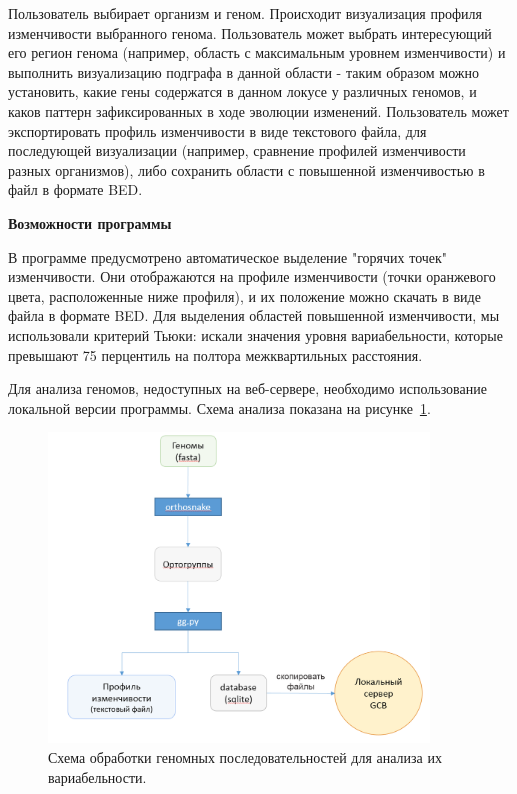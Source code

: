 Пользователь выбирает организм и геном. Происходит визуализация профиля изменчивости выбранного генома. Пользователь может выбрать интересующий его регион генома (например, область с максимальным уровнем изменчивости) и выполнить визуализацию подграфа в данной области - таким образом можно установить, какие гены содержатся в данном локусе у различных геномов, и каков паттерн зафиксированных в ходе эволюции изменений. Пользователь может экспортировать профиль изменчивости в виде текстового файла, для последующей визуализации (например, сравнение профилей изменчивости разных организмов), либо сохранить области с повышенной изменчивостью в файл в формате BED. 

\textbf{Возможности программы}

В программе предусмотрено автоматическое выделение "горячих точек" изменчивости. Они отображаются на профиле изменчивости (точки оранжевого цвета, расположенные ниже профиля), и их положение можно скачать в виде файла в формате BED. Для выделения областей повышенной изменчивости, мы использовали критерий Тьюки: искали значения уровня вариабельности, которые превышают 75 перцентиль на полтора межквартильных расстояния. 

Для анализа геномов, недоступных на веб-сервере, необходимо использование локальной версии программы. Схема анализа показана на рисунке~\ref{img:gcb_scheme}.

\begin{figure}[!ht] 
	\center
	\includegraphics [width=0.9\textwidth] {Dissertation/images/gcb/standalone_scheme.png}
	\caption{Схема обработки геномных последовательностей для анализа их вариабельности.}
	\label{img:gcb_scheme}
\end{figure}

